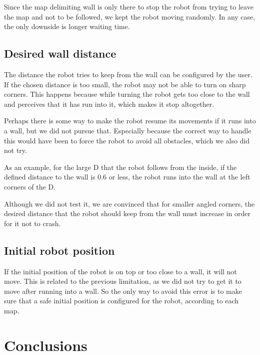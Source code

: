 \documentclass[12pt,a4paper,reqno]{article}
\numberwithin{figure}{section}
\numberwithin{equation}{section}
\begin{document}
Since the map delimiting wall is only there to stop the robot from trying to leave the map and not to be followed, we kept the robot moving randomly. In any case, the only downside is longer waiting time.

\subsection{Desired wall distance}

The distance the robot tries to keep from the wall can be configured by the user. If the chosen distance is too small, the robot may not be able to turn on sharp corners. This happens because while turning the robot gets too close to the wall and perceives that it has run into it, which makes it stop altogether.

Perhaps there is some way to make the robot resume its movements if it runs into a wall, but we did not pursue that. Especially because the correct way to handle this would have been to force the robot to avoid all obstacles, which we also did not try.

As an example, for the large D that the robot follows from the inside, if the defined distance to the wall is 0.6 or less, the robot runs into the wall at the left corners of the D.

Although we did not test it, we are convinced that for smaller angled corners, the desired distance that the robot should keep from the wall must increase in order for it not to crash.

\subsection{Initial robot position}

If the initial position of the robot is on top or too close to a wall, it will not move. This is related to the previous limitation, as we did not try to get it to move after running into a wall. So the only way to avoid this error is to make sure that a safe initial position is configured for the robot, according to each map.

\section{Conclusions}



\end{document}
